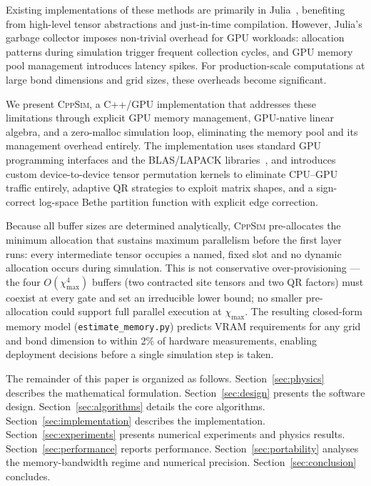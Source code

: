 \documentclass[11pt]{article}
\newcommand{\chimax}{\chi_{\mathrm{max}}}
\begin{document}
Existing implementations of these methods are primarily in Julia~\citep{rudolph2025simulating},
benefiting from high-level tensor abstractions and just-in-time compilation. However,
Julia's garbage collector imposes non-trivial overhead for GPU workloads:
allocation patterns during simulation trigger frequent collection cycles, and GPU
memory pool management introduces latency spikes. For production-scale computations
at large bond dimensions and grid sizes, these overheads become significant.

We present \textsc{CppSim}, a C++/GPU implementation that addresses these limitations
through explicit GPU memory management, GPU-native linear algebra, and a zero-malloc
simulation loop, eliminating the memory pool and its management overhead entirely.
The implementation uses standard GPU programming interfaces and the BLAS/LAPACK
libraries~\citep{rocblas,rocsolver}, and introduces custom device-to-device tensor
permutation kernels to eliminate CPU--GPU traffic entirely, adaptive QR strategies
to exploit matrix shapes, and a sign-correct log-space Bethe partition function
with explicit edge correction.

Because all buffer sizes are determined analytically, \textsc{CppSim}
pre-allocates the minimum allocation that sustains maximum parallelism
before the first layer runs: every intermediate tensor occupies a named,
fixed slot and no dynamic allocation occurs during simulation.
This is not conservative over-provisioning --- the four $O(\chimax^4)$
buffers (two contracted site tensors and two QR factors) must coexist at
every gate and set an irreducible lower bound; no smaller pre-allocation
could support full parallel execution at $\chimax$.
The resulting closed-form memory model (\texttt{estimate\_memory.py})
predicts VRAM requirements for any grid and bond dimension to within 2\%
of hardware measurements, enabling deployment decisions before a single
simulation step is taken.

The remainder of this paper is organized as follows. Section~\ref{sec:physics}
describes the mathematical formulation. Section~\ref{sec:design} presents the
software design. Section~\ref{sec:algorithms} details the core algorithms.
Section~\ref{sec:implementation} describes the implementation.
Section~\ref{sec:experiments} presents numerical experiments and physics results.
Section~\ref{sec:performance} reports performance. Section~\ref{sec:portability}
analyses the memory-bandwidth regime and numerical precision. Section~\ref{sec:conclusion} concludes.
\end{document}
